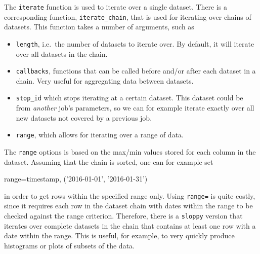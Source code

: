 The \texttt{iterate} function is used to iterate over a single
dataset.  There is a corresponding function, \texttt{iterate\_chain},
that is used for iterating over chains of datasets.  This function
takes a number of arguments, such as
\begin{itemize}
\item[] \texttt{length}, i.e.\ the number of datasets to iterate over.
  By default, it will iterate over all datasets in the chain.
\item[] \texttt{callbacks}, functions that can be called before and/or
  after each dataset in a chain.  Very useful for aggregating data
  between datasets.
\item[] \texttt{stop\_id} which stops iterating at a certain dataset.
  This dataset could be from \textsl{another} job's parameters, so we
  can for example iterate exactly over all new datasets not covered by
  a previous job.
\item[] \texttt{range}, which allows for iterating over a range of
  data.
\end{itemize}
The \texttt{range} options is based on the max/min values stored for
each column in the dataset.  Assuming that the chain is sorted, one
can for example set
\begin{python}
  range={timestamp, ('2016-01-01', '2016-01-31')}
\end{python}
in order to get rows within the specified range only.  Using
\texttt{range=} is quite costly, since it requires each row in the
dataset chain with dates within the range to be checked against the
range criterion.  Therefore, there is a \texttt{sloppy} version that
iterates over complete datasets in the chain that contains at least
one row with a date within the range.  This is useful, for example, to
very quickly produce histograms or plots of subsets of the data.





